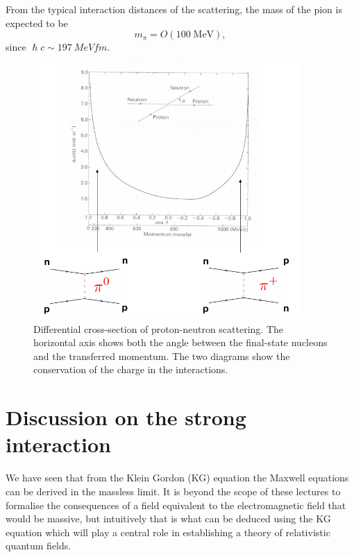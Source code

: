 From the typical interaction distances of the scattering, the mass of the pion is expected to be
\begin{equation*}
   m_{\pi} = O(100\;\mbox{MeV}),
\end{equation*}
since $\hslash c \sim \SI{197}{MeV fm}$.

\begin{figure}[h]
    \includegraphics[width=0.9\textwidth]{Figures/yukawa-graph1}
    \caption{Differential cross-section of proton-neutron scattering. The horizontal axis shows both the angle between the final-state nucleons and the transferred momentum. The two diagrams show the conservation of the charge in the interactions.}
    \label{fig:yukawa-graph1}
\end{figure}


\section{Discussion on the strong interaction}

We have seen that from the Klein Gordon (KG) equation the Maxwell equations can be derived in the massless limit. It is beyond the scope of these lectures to formalise the consequences of a field equivalent to the electromagnetic field that would be massive, but intuitively that is what can be deduced using the KG equation which will play a central role in establishing a theory of relativistic quantum fields.

